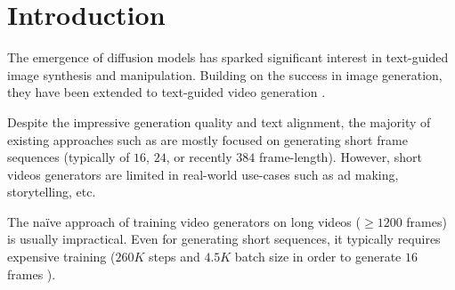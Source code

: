 \section{Introduction}
\label{sec:intro}

The emergence of diffusion models \cite{DDPM_paper,DDIM_paper,stable_diff,Dalle2_paper} has sparked significant interest in text-guided image synthesis and manipulation.
Building on the success in image generation, they have been extended to text-guided video generation  \cite{video-diffusion-models,Modelscope,AlignYourLatents,chen2023seine,make-a-video,girdhar2023emu,SVD,guo2023animatediff,li2023videogen,zhang2023show1,guo2023sparsectrl,text2video-zero,villegas2022phenaki}.

Despite the impressive generation quality and text alignment, the majority of existing approaches such as  \cite{video-diffusion-models,Modelscope,AlignYourLatents,SVD,zhang2023show1,opensora,opensoraplan} are mostly focused on generating short frame sequences (typically of $16$, $24$, or recently $384$ frame-length).  
However, short videos generators are limited in real-world use-cases such as ad making, storytelling, etc. 

The na\"ive approach of training video generators on long videos (\eg $\geq 1200$ frames) is usually impractical. Even for generating short sequences, it typically  requires expensive training (\eg $260K$ steps and $4.5K$ batch size  in order to generate $16$ frames \cite{Modelscope}). 


